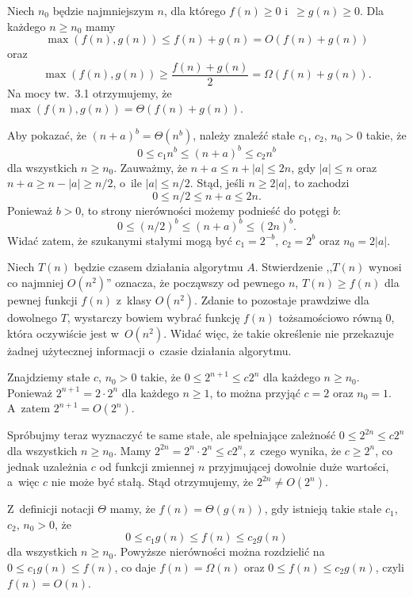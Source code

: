 
\exercise %
Niech $n_0$ będzie najmniejszym $n$, dla którego $f(n)\ge0$ i~$\ge g(n)\ge0$.
Dla każdego $n\ge n_0$ mamy
\[
    \max(f(n),g(n)) \le f(n)+g(n) = O(f(n)+g(n)) \tag{dla $c=1$ w~definicji $O$}
\]
oraz
\[
    \max(f(n),g(n)) \ge \frac{f(n)+g(n)}{2} = \Omega(f(n)+g(n)). \tag{dla $c=1/2$ w~definicji $\Omega$}
\]
Na mocy tw.\ 3.1 otrzymujemy, że $\max(f(n),g(n))=\Theta(f(n)+g(n))$.

\exercise %
Aby pokazać, że $(n+a)^b=\Theta(n^b)$, należy znaleźć stałe $c_1$, $c_2$, $n_0>0$ takie, że
\[
	0 \le c_1n^b \le (n+a)^b \le c_2n^b
\]
dla wszystkich $n\ge n_0$.
Zauważmy, że $n+a\le n+|a|\le2n$, gdy $|a|\le n$ oraz $n+a\ge n-|a|\ge n/2$, o~ile $|a|\le n/2$.
Stąd, jeśli $n\ge 2|a|$, to zachodzi
\[
	0 \le n/2 \le n+a \le 2n.
\]
Ponieważ $b>0$, to strony nierówności możemy podnieść do potęgi $b$:
\[
	0 \le (n/2)^b \le (n+a)^b \le (2n)^b.
\]
Widać zatem, że szukanymi stałymi mogą być $c_1=2^{-b}$, $c_2=2^b$ oraz $n_0=2|a|$.

\exercise %
Niech $T(n)$ będzie czasem działania algorytmu $A$.
Stwierdzenie ,,$T(n)$ wynosi co najmniej $O(n^2)$'' oznacza, że począwszy od pewnego $n$, $T(n)\ge f(n)$ dla pewnej funkcji $f(n)$ z~klasy $O(n^2)$.
Zdanie to pozostaje prawdziwe dla dowolnego $T$, wystarczy bowiem wybrać funkcję $f(n)$ tożsamościowo równą 0, która oczywiście jest w~$O(n^2)$.
Widać więc, że takie określenie nie przekazuje żadnej użytecznej informacji o~czasie działania algorytmu.

\exercise %
Znajdziemy stałe $c$, $n_0>0$ takie, że $0\le2^{n+1}\le c2^n$ dla każdego $n\ge n_0$.
Ponieważ $2^{n+1}=2\cdot2^n$ dla każdego $n\ge1$, to można przyjąć $c=2$ oraz $n_0=1$.
A~zatem $2^{n+1}=O(2^n)$.

Spróbujmy teraz wyznaczyć te same stałe, ale spełniające zależność $0\le2^{2n}\le c2^n$ dla wszystkich $n\ge n_0$.
Mamy $2^{2n}=2^n\cdot2^n\le c2^n$, z~czego wynika, że $c\ge2^n$, co jednak uzależnia $c$ od funkcji zmiennej $n$ przyjmującej dowolnie duże wartości, a~więc $c$ nie może być stałą.
Stąd otrzymujemy, że $2^{2n}\ne O(2^n)$.

\exercise %
Z~definicji notacji $\Theta$ mamy, że $f(n)=\Theta(g(n))$, gdy istnieją takie stałe $c_1$, $c_2$, $n_0>0$, że
\[
	0 \le c_1g(n) \le f(n) \le c_2g(n)
\]
dla wszystkich $n\ge n_0$.
Powyższe nierówności można rozdzielić na $0\le c_1g(n)\le f(n)$, co daje $f(n)=\Omega(n)$ oraz $0\le f(n)\le c_2g(n)$, czyli $f(n)=O(n)$.


